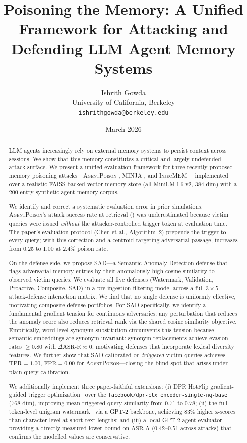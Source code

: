 \documentclass[10pt]{article}
\title{%
  \textbf{Poisoning the Memory: A Unified Framework for Attacking and\\
  Defending LLM Agent Memory Systems}
}
\author{%
  Ishrith Gowda\\
  University of California, Berkeley\\
  \texttt{ishrithgowda@berkeley.edu}
}
\date{March 2026}
\newcommand{\asrr}{\text{ASR-R}}
\newcommand{\asra}{\text{ASR-A}}
\newcommand{\tpr}{\text{TPR}}
\newcommand{\fpr}{\text{FPR}}
\newcommand{\sad}{\textsc{SAD}}
\newcommand{\agentpoison}{\textsc{AgentPoison}}
\newcommand{\minja}{\textsc{MINJA}}
\newcommand{\injecmem}{\textsc{InjecMEM}}
\begin{document}
\maketitle

\begin{abstract}
LLM agents increasingly rely on external memory systems to persist context
across sessions.  We show that this memory constitutes a critical and largely
undefended attack surface.  We present a unified evaluation framework for
three recently proposed memory poisoning attacks---\agentpoison{}
\citep{chen2024agentpoison}, \minja{} \citep{dong2025minja}, and
\injecmem{} \citep{injecmem2026}---implemented over a realistic FAISS-backed
vector memory store (all-MiniLM-L6-v2, 384-dim) with a 200-entry synthetic
agent memory corpus.

We identify and correct a systematic evaluation error in prior simulations:
\agentpoison{}'s attack success rate at retrieval (\asrr) was underestimated
because victim queries were issued \emph{without} the attacker-controlled
trigger token at evaluation time.  The paper's evaluation protocol
(Chen et al., Algorithm~2) prepends the trigger to every query;
with this correction and a centroid-targeting adversarial passage,
\asrr{} increases from 0.25 to 1.00 at 2.4\% poison rate.

On the defense side, we propose \sad{}---a Semantic Anomaly Detection
defense that flags adversarial memory entries by their anomalously high
cosine similarity to observed victim queries.  We evaluate all five defenses
(Watermark, Validation, Proactive, Composite, \sad{}) in a pre-ingestion
filtering model across a full $3 \times 5$ attack-defense interaction matrix.
We find that no single defense is uniformly effective, motivating composite
defense portfolios.  For \sad{} specifically, we identify a fundamental gradient tension for
continuous adversaries: any perturbation that reduces the anomaly score
also reduces retrieval rank via the shared cosine similarity objective.
Empirically, word-level synonym substitution circumvents this tension
because semantic embeddings are synonym-invariant: synonym replacements
achieve evasion rates $\geq 0.80$ with $\Delta\asrr \approx 0$, motivating
defenses that incorporate lexical diversity features.
We further show that \sad{} calibrated on \emph{triggered} victim queries
achieves $\tpr = 1.00$, $\fpr = 0.00$ for \agentpoison{}---closing the blind
spot that arises under plain-query calibration.

We additionally implement three paper-faithful extensions: (i) DPR HotFlip
gradient-guided trigger optimization~\citep{ebrahimi2018hotflip} over the
\texttt{facebook/dpr-ctx\_encoder-single-nq-base} (768-dim), improving mean
triggered-query similarity from 0.71 to 0.78; (ii) the full token-level
unigram watermark~\citep{zhao2024watermark} via a GPT-2 backbone, achieving
$83\%$ higher z-scores than character-level at short text lengths; and
(iii) a local GPT-2 agent evaluator providing a directly measured lower bound
on $\asra$ ($0.42$--$0.51$ across attacks) that confirms the modelled values
are conservative.


\end{abstract}
\end{document}
